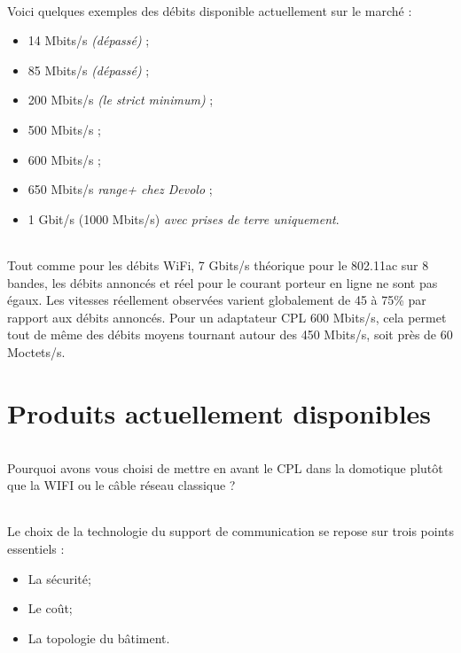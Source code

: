             \paragraph{}
Voici quelques exemples des débits disponible actuellement sur le marché :
                \begin{itemize}
                    \item 14 Mbits/s \emph{(dépassé)} ;
                    \item 85 Mbits/s \emph{(dépassé)} ;
                    \item 200 Mbits/s \emph{(le strict minimum)} ;
                    \item 500 Mbits/s ;
                    \item 600 Mbits/s ;
                    \item 650 Mbits/s \emph{range+ chez Devolo} ;
                    \item 1 Gbit/s (1000 Mbits/s) \emph{avec prises de terre uniquement}.
                \end{itemize}
            \paragraph{}
Tout comme pour les débits WiFi, 7 Gbits/s théorique pour le 802.11ac sur 8 bandes,
les débits annoncés et réel pour le courant porteur en ligne ne sont pas égaux.
Les vitesses réellement observées varient globalement de 45 à 75\% par rapport aux débits annoncés.
Pour un adaptateur CPL 600 Mbits/s, cela permet tout de même des débits moyens tournant autour des 450 Mbits/s, soit près de 60 Moctets/s.


\part{Produits actuellement disponibles}
    \paragraph{}
Pourquoi avons vous choisi de mettre en avant le CPL dans la domotique plutôt que la WIFI ou le câble réseau classique ?
    \paragraph{}
Le choix de la technologie du support de communication se repose sur trois points essentiels :
        \begin{itemize}
            \item La sécurité;
            \item Le coût;
            \item La topologie du bâtiment.
        \end{itemize}
